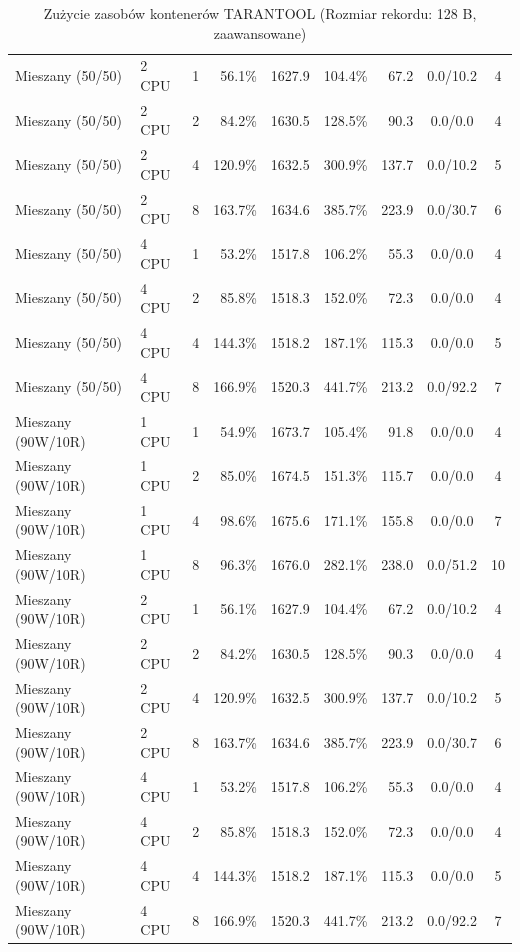 \begin{table}[ht]
{\begin{tabular}{llcrrrrcc}
Mieszany (50/50) & 2 CPU & 1 & 56.1\% & 1627.9 & 104.4\% & 67.2 & 0.0/10.2 & 4 \\
Mieszany (50/50) & 2 CPU & 2 & 84.2\% & 1630.5 & 128.5\% & 90.3 & 0.0/0.0 & 4 \\
Mieszany (50/50) & 2 CPU & 4 & 120.9\% & 1632.5 & 300.9\% & 137.7 & 0.0/10.2 & 5 \\
Mieszany (50/50) & 2 CPU & 8 & 163.7\% & 1634.6 & 385.7\% & 223.9 & 0.0/30.7 & 6 \\
Mieszany (50/50) & 4 CPU & 1 & 53.2\% & 1517.8 & 106.2\% & 55.3 & 0.0/0.0 & 4 \\
Mieszany (50/50) & 4 CPU & 2 & 85.8\% & 1518.3 & 152.0\% & 72.3 & 0.0/0.0 & 4 \\
Mieszany (50/50) & 4 CPU & 4 & 144.3\% & 1518.2 & 187.1\% & 115.3 & 0.0/0.0 & 5 \\
Mieszany (50/50) & 4 CPU & 8 & 166.9\% & 1520.3 & 441.7\% & 213.2 & 0.0/92.2 & 7 \\
Mieszany (90W/10R) & 1 CPU & 1 & 54.9\% & 1673.7 & 105.4\% & 91.8 & 0.0/0.0 & 4 \\
Mieszany (90W/10R) & 1 CPU & 2 & 85.0\% & 1674.5 & 151.3\% & 115.7 & 0.0/0.0 & 4 \\
Mieszany (90W/10R) & 1 CPU & 4 & 98.6\% & 1675.6 & 171.1\% & 155.8 & 0.0/0.0 & 7 \\
Mieszany (90W/10R) & 1 CPU & 8 & 96.3\% & 1676.0 & 282.1\% & 238.0 & 0.0/51.2 & 10 \\
Mieszany (90W/10R) & 2 CPU & 1 & 56.1\% & 1627.9 & 104.4\% & 67.2 & 0.0/10.2 & 4 \\
Mieszany (90W/10R) & 2 CPU & 2 & 84.2\% & 1630.5 & 128.5\% & 90.3 & 0.0/0.0 & 4 \\
Mieszany (90W/10R) & 2 CPU & 4 & 120.9\% & 1632.5 & 300.9\% & 137.7 & 0.0/10.2 & 5 \\
Mieszany (90W/10R) & 2 CPU & 8 & 163.7\% & 1634.6 & 385.7\% & 223.9 & 0.0/30.7 & 6 \\
Mieszany (90W/10R) & 4 CPU & 1 & 53.2\% & 1517.8 & 106.2\% & 55.3 & 0.0/0.0 & 4 \\
Mieszany (90W/10R) & 4 CPU & 2 & 85.8\% & 1518.3 & 152.0\% & 72.3 & 0.0/0.0 & 4 \\
Mieszany (90W/10R) & 4 CPU & 4 & 144.3\% & 1518.2 & 187.1\% & 115.3 & 0.0/0.0 & 5 \\
Mieszany (90W/10R) & 4 CPU & 8 & 166.9\% & 1520.3 & 441.7\% & 213.2 & 0.0/92.2 & 7 \\
\bottomrule
\end{tabular}%
}
\caption{Zużycie zasobów kontenerów TARANTOOL (Rozmiar rekordu: 128 B, zaawansowane)}
\label{tab:resources_tarantool_small_0}
\end{table}
